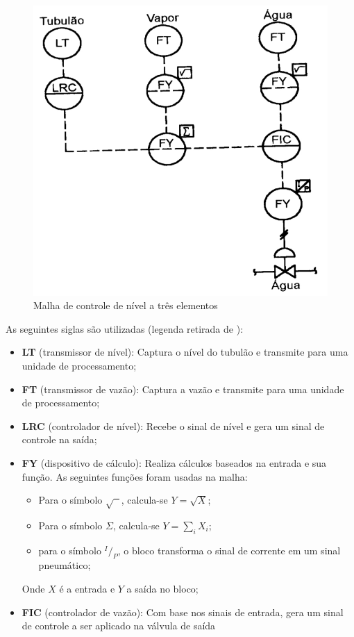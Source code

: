 \begin{figure}[H]
  \caption{\label{malha_3_elementos} Malha de controle de nível
  a três elementos}
  \begin{center}
    \includegraphics[scale=.35]{img/malha_3_eltos.png}
  \end{center}
\end{figure}

As seguintes siglas são utilizadas (legenda retirada de
):

\begin{itemize}
\item \textbf{LT} (transmissor de nível): Captura o nível do tubulão e
  transmite para uma unidade de processamento;
\item \textbf{FT} (transmissor de vazão): Captura a vazão e transmite
  para uma unidade de processamento;
\item \textbf{LRC} (controlador de nível): Recebe o sinal de nível e
  gera um sinal de controle na saída;
\item \textbf{FY} (dispositivo de cálculo): Realiza cálculos baseados
  na entrada e sua função. As seguintes funções foram usadas na
  malha:
  \begin{itemize}
  \item Para o símbolo $\sqrt{\phantom{x}}$, calcula-se $Y=\sqrt{X}$;
  \item Para o símbolo $\Sigma$, calcula-se $Y=\sum_{i} X_i$;
  \item para o símbolo $^I/_P$, o bloco transforma o sinal de corrente
    em um sinal pneumático;
  \end{itemize}
  Onde $X$ é a entrada e $Y$ a saída no bloco;
\item \textbf{FIC} (controlador de vazão): Com base nos sinais de
  entrada, gera um sinal de controle a ser aplicado na válvula de saída
\end{itemize}

